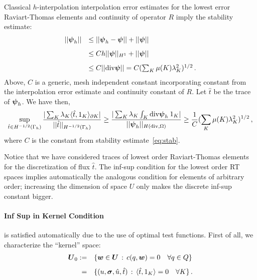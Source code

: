 \documentclass{report}
\begin{document}
Classical $h$-interpolation interpolation error estimates for the lowest error
Raviart-Thomas elements and continuity of operator $R$ imply the stability estimate:
\begin{equation}
\begin{array}{lll}
|| \boldsymbol\psi_h || & \leq || \boldsymbol\psi_h - \boldsymbol\psi || + || \boldsymbol\psi ||\\[8pt]
&\leq C h || \boldsymbol\psi ||_{H^1} +  || \boldsymbol\psi || \\[8pt]
& \leq C || \text{div} \boldsymbol\psi || = C (\sum_K \mu(K) \lambda_K^2)^{1/2}\,.
\end{array}
\label{eq:stab}
\end{equation}
Above, $C$ is a generic, mesh independent constant incorporating constant from
the interpolation error estimate and continuity constant of $R$.
Let $\hat{t}$ be the trace of $\boldsymbol\psi_h$. We have then,
\begin{equation}
\sup_{\hat{t} \in H^{-1/2}(\Gamma_h)} \frac{|  \sum_K \lambda_K \langle
\hat{t},1_K \rangle_{\partial K} |}{|| \hat{t} ||_{H^{-1/2}(\Gamma_h)}}
\geq \frac{| \sum_K \lambda_K \int_K \text{div} \boldsymbol\psi_h \: 1_K  |}
{|| \boldsymbol\psi_h ||_{H(\text{div},\Omega)}}
\geq \frac{1}{C} (\sum_K \mu(K) \lambda_K^2)^{1/2}\,,
\end{equation}
where $C$ is the constant from stability estimate~\eqref{eq:stab}.

Notice that we have considered traces of lowest order Raviart-Thomas elements
for the discretization of flux $\hat{t}$. The inf-sup condition for the lowest
order RT spaces implies automatically the analogous condition for elements of
arbitrary order; increasing the dimension of space $U$ only makes the discrete
inf-sup constant bigger.

\paragraph{Inf Sup in Kernel Condition} is satisfied automatically due to the use of optimal
test functions. First of all, we characterize the ``kernel'' space:
\begin{equation}
\begin{array}{rl}
\boldsymbol U_0  := & \{ \boldsymbol w \in \boldsymbol U \, : \, c(q,\boldsymbol w) = 0 \quad \forall q \in Q\} \\[8pt]
 = &\{ (u,\boldsymbol\sigma,\hat{u},\hat{t}) \, : \, \langle \hat{t},1_K \rangle = 0
 \quad \forall K \}\,.
\end{array}
\end{equation}
\end{document}
